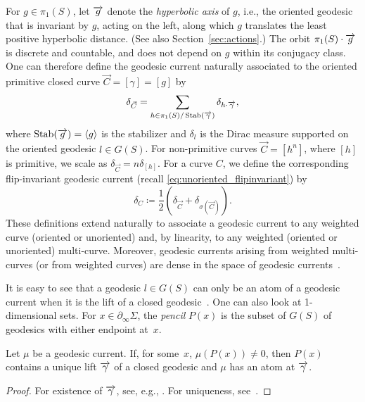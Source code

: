 For $g \in \pi_1(S)$, let $\overrightarrow{g}$ denote the \emph{hyperbolic axis}
of $g$, i.e., the oriented geodesic that is invariant by $g$, acting
on the left, along which
$g$ translates the least positive hyperbolic distance. (See also
Section~\ref{sec:actions}.)
The orbit $\pi_1(S)\cdot \overrightarrow{g}$ is discrete and countable, and does
not depend on $g$ within its conjugacy class. One can therefore define
the geodesic current naturally associated to the oriented primitive closed curve
$\vec C=[\gamma]=[g]$ by
\begin{equation}\label{eq:delta-curve}
\delta_{\vec C}
= \sum_{h \in \pi_1(S)/\operatorname{Stab}(\overrightarrow{\gamma})}
\delta_{h\cdot \overrightarrow{\gamma}},
\end{equation}
where $\operatorname{Stab}(\overrightarrow{g}) = \langle g \rangle$ is the
stabilizer and $\delta_l$ is the Dirac measure supported on
the oriented geodesic $l\in G(S)$. For non-primitive curves $\vec C=[h^n]$,
where $[h]$ is primitive, we scale as $\delta_{\vec C} = n \delta_{[h]}$.
For a curve $C$, we define the corresponding flip-invariant geodesic current (recall \eqref{eq:unoriented_flipinvariant}) by
\[
\delta_C \coloneqq \frac12 \left( \delta_{\vec{C}}+ \delta_{\sigma(\vec C)} \right).
\]
These definitions extend naturally to associate a geodesic current to
any weighted curve (oriented or unoriented) and, by linearity, to any
weighted (oriented or unoriented) multi-curve. Moreover, geodesic
currents arising from weighted multi-curves (or from
weighted curves) are dense in the space of geodesic
currents~\cite[Proposition~4.4]{Bonahon86:EndsHyperbolicManifolds}.

It is easy to see that a geodesic $l \in G(S)$ can only be an atom of a geodesic current when it is the lift of a closed geodesic~\cite[Proposition~8.2.7]{Martelli16:IntroGeoTop}.
One can also look at 1-dimensional sets.
For $x \in \partial_{\infty}\Sigma$, the
\emph{pencil} $P(x)$ is the subset of $G(S)$ of geodesics with either
endpoint at~$x$.


\begin{proposition}
  \label{prop:spikes}
  Let $\mu$ be a geodesic current. If, for some~$x$, $\mu(P(x)) \ne
  0$, then $P(x)$ contains a unique lift $\overrightarrow{\gamma}$ of a closed
  geodesic and $\mu$ has an atom at $\overrightarrow{\gamma}$.
\end{proposition}
\begin{proof}
  For existence of $\overrightarrow{\gamma}$, see, e.g.,
  \cite[Lemma~2.6]{dRMG22:Duals}.
For uniqueness, see~\cite[Corollary~4.2.3]{Martelli16:IntroGeoTop}.
\end{proof}



